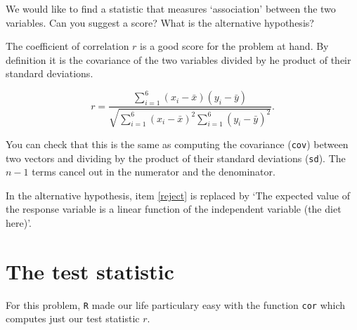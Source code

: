 \documentclass[a4paper]{article}
\theoremstyle{definition}
\begin{document}
\begin{Exercise}
We would like to find a statistic that measures `association' between
the two variables. Can you suggest a score? What is the alternative
hypothesis?
\end{Exercise}
\begin{Answer}
The coefficient of correlation $r$ is a good score for the problem at
hand. By definition it is the covariance of the two variables divided
by he product of their standard deviations.

\begin{equation*}
r = \frac{\sum_{i=1}^6(x_i - \bar{x})(y_i - \bar{y})}
  {\sqrt{\sum_{i=1}^6(x_i - \bar{x})^2 \sum_{i=1}^6(y_i - \bar{y})^2}}.
\end{equation*}

You can check that this is the same as computing the covariance
(\texttt{cov}) between two vectors and dividing by the product of their
standard deviations (\texttt{sd}). The $n-1$ terms cancel out in the
numerator and the denominator.

In the alternative hypothesis, item \ref{reject} is replaced by `The
expected value of the response variable is a linear function of the
independent variable (the diet here)'.
\end{Answer}


\section{The test statistic}

For this problem, \texttt{R} made our life particulary easy with the
function \texttt{cor} which computes just our test statistic $r$.
\end{document}
